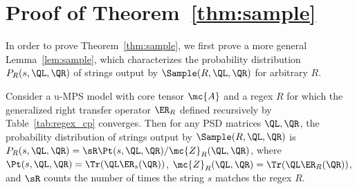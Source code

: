 \section{Proof of Theorem~\ref{thm:sample}}
\label{sec:appendix_b}

In order to prove Theorem~\ref{thm:sample}, 
we first prove a more general Lemma~\ref{lem:sample}, which characterizes the probability distribution $P_R(s, \QL, \QR)$ of strings output by $\Sample(R, \QL, \QR)$ for arbitrary $R$.
%
\begin{lemma}
\label{lem:sample}
Consider a u-MPS model with core tensor $\mc{A}$ and a regex $R$ for which the generalized right transfer operator $\ER_R$ defined recursively by Table~\ref{tab:regex_cp} 
converges. Then for any PSD matrices $\QL, \QR$, the probability distribution of strings output by $\Sample(R, \QL, \QR)$ is $P_R(s, \QL, \QR) = \sR \Pt(s, \QL, \QR) / \mc{Z}_R(\QL, \QR)$, where $\Pt(s, \QL, \QR) = \Tr(\QL \ER_s(\QR))$, $\mc{Z}_R(\QL, \QR) = \Tr(\QL \ER_R(\QR))$, and $\sR$ counts the number of times the string $s$ matches the regex $R$.
\end{lemma}

